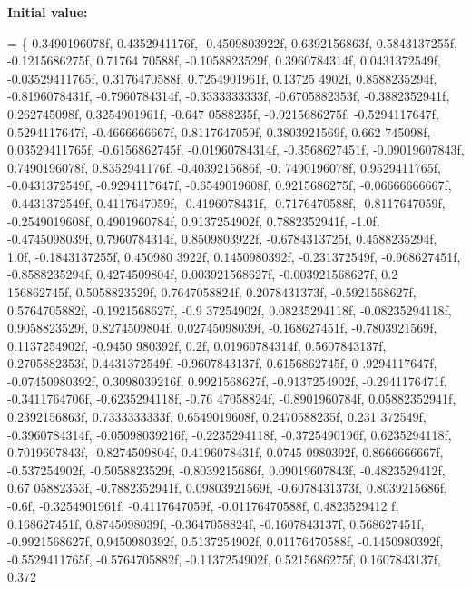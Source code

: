 {\bfseries Initial value\+:}
\begin{DoxyCode}
=
    \{
        0.3490196078f, 0.4352941176f, -0.4509803922f, 0.6392156863f, 0.5843137255f, -0.1215686275f, 0.71764
      70588f, -0.1058823529f, 0.3960784314f, 0.0431372549f, -0.03529411765f, 0.3176470588f, 0.7254901961f, 0.13725
      4902f, 0.8588235294f, -0.8196078431f,
        -0.7960784314f, -0.3333333333f, -0.6705882353f, -0.3882352941f, 0.262745098f, 0.3254901961f, -0.647
      0588235f, -0.9215686275f, -0.5294117647f, 0.5294117647f, -0.4666666667f, 0.8117647059f, 0.3803921569f, 0.662
      745098f, 0.03529411765f, -0.6156862745f,
        -0.01960784314f, -0.3568627451f, -0.09019607843f, 0.7490196078f, 0.8352941176f, -0.4039215686f, -0.
      7490196078f, 0.9529411765f, -0.0431372549f, -0.9294117647f, -0.6549019608f, 0.9215686275f, -0.06666666667f, 
      -0.4431372549f, 0.4117647059f, -0.4196078431f,
        -0.7176470588f, -0.8117647059f, -0.2549019608f, 0.4901960784f, 0.9137254902f, 0.7882352941f, -1.0f,
       -0.4745098039f, 0.7960784314f, 0.8509803922f, -0.6784313725f, 0.4588235294f, 1.0f, -0.1843137255f, 0.450980
      3922f, 0.1450980392f,
        -0.231372549f, -0.968627451f, -0.8588235294f, 0.4274509804f, 0.003921568627f, -0.003921568627f, 0.2
      156862745f, 0.5058823529f, 0.7647058824f, 0.2078431373f, -0.5921568627f, 0.5764705882f, -0.1921568627f, -0.9
      37254902f, 0.08235294118f, -0.08235294118f,
        0.9058823529f, 0.8274509804f, 0.02745098039f, -0.168627451f, -0.7803921569f, 0.1137254902f, -0.9450
      980392f, 0.2f, 0.01960784314f, 0.5607843137f, 0.2705882353f, 0.4431372549f, -0.9607843137f, 0.6156862745f, 0
      .9294117647f, -0.07450980392f,
        0.3098039216f, 0.9921568627f, -0.9137254902f, -0.2941176471f, -0.3411764706f, -0.6235294118f, -0.76
      47058824f, -0.8901960784f, 0.05882352941f, 0.2392156863f, 0.7333333333f, 0.6549019608f, 0.2470588235f, 0.231
      372549f, -0.3960784314f, -0.05098039216f,
        -0.2235294118f, -0.3725490196f, 0.6235294118f, 0.7019607843f, -0.8274509804f, 0.4196078431f, 0.0745
      0980392f, 0.8666666667f, -0.537254902f, -0.5058823529f, -0.8039215686f, 0.09019607843f, -0.4823529412f, 0.67
      05882353f, -0.7882352941f, 0.09803921569f,
        -0.6078431373f, 0.8039215686f, -0.6f, -0.3254901961f, -0.4117647059f, -0.01176470588f, 0.4823529412
      f, 0.168627451f, 0.8745098039f, -0.3647058824f, -0.1607843137f, 0.568627451f, -0.9921568627f, 0.9450980392f,
       0.5137254902f, 0.01176470588f,
        -0.1450980392f, -0.5529411765f, -0.5764705882f, -0.1137254902f, 0.5215686275f, 0.1607843137f, 0.372

\end{DoxyCode}

